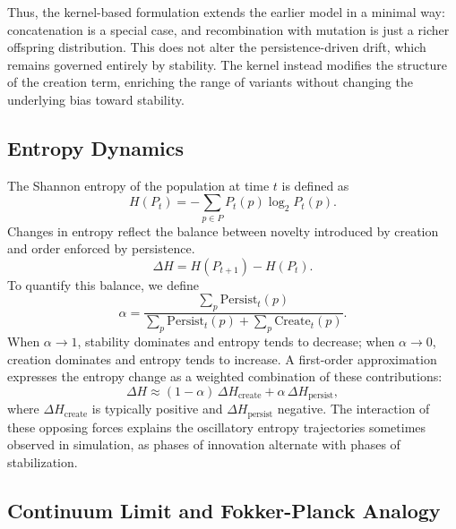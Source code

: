 \documentclass{artificial-life}
\begin{document}
Thus, the kernel-based formulation extends the earlier model in a minimal
way: concatenation is a special case, and recombination with mutation is
just a richer offspring distribution. This does not alter the persistence-driven drift, which remains governed entirely by stability. The kernel instead modifies the structure of the creation term, enriching the range of variants without changing the underlying bias toward stability.


\subsection{Entropy Dynamics}

The Shannon entropy of the population at time $t$ is defined as
\begin{equation}
H(P_t) = - \sum_{p \in P} P_t(p) \log_2 P_t(p).
\end{equation}
Changes in entropy reflect the balance between novelty introduced by creation and order enforced by persistence.
\begin{equation}
\Delta H = H(P_{t+1}) - H(P_t).
\end{equation}
To quantify this balance, we define
\begin{equation}
\alpha = \frac{\sum_p \mathrm{Persist}_t(p)}
{\sum_p \mathrm{Persist}_t(p) + \sum_p \mathrm{Create}_t(p)}.
\end{equation}
When $\alpha \to 1$, stability dominates and entropy tends to decrease; when $\alpha \to 0$, creation dominates and entropy tends to increase.  
A first-order approximation expresses the entropy change as a weighted combination of these contributions:
\begin{equation}
\Delta H \approx (1 - \alpha)\,\Delta H_{\text{create}} + \alpha\,\Delta H_{\text{persist}},
\end{equation}
where $\Delta H_{\text{create}}$ is typically positive and $\Delta H_{\text{persist}}$ negative.  The interaction of these opposing forces explains the oscillatory entropy trajectories sometimes observed in simulation, as phases of innovation alternate with phases of stabilization.

\subsection{Continuum Limit and Fokker-Planck Analogy}
\end{document}
